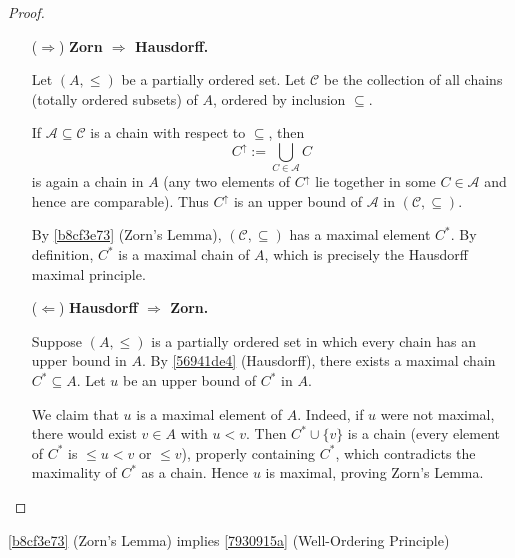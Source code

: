 \begin{proof}
    \begin{enumerate}
        \item[($\Rightarrow$)] \textbf{Zorn $\Rightarrow$ Hausdorff.}
        
        Let $(A,\le)$ be a partially ordered set. Let $\mathscr{C}$ be the collection of all chains (totally ordered subsets) of $A$, ordered by inclusion $\subseteq$. 
        
        If $\mathscr{A}\subseteq \mathscr{C}$ is a chain with respect to $\subseteq$, then
        \[
            C^\uparrow := \bigcup_{C\in \mathscr{A}} C
        \]
        is again a chain in $A$ (any two elements of $C^\uparrow$ lie together in some $C\in\mathscr{A}$ and hence are comparable). Thus $C^\uparrow$ is an upper bound of $\mathscr{A}$ in $(\mathscr{C},\subseteq)$.
        
        By \cref{b8cf3e73} (Zorn's Lemma), $(\mathscr{C},\subseteq)$ has a maximal element $C^*$. By definition, $C^*$ is a maximal chain of $A$, which is precisely the Hausdorff maximal principle.
        
        \item[($\Leftarrow$)] \textbf{Hausdorff $\Rightarrow$ Zorn.}
        
        Suppose $(A,\le)$ is a partially ordered set in which every chain has an upper bound in $A$. By \cref{56941de4} (Hausdorff), there exists a maximal chain $C^*\subseteq A$. Let $u$ be an upper bound of $C^*$ in $A$.
        
        We claim that $u$ is a maximal element of $A$. Indeed, if $u$ were not maximal, there would exist $v\in A$ with $u<v$. Then $C^*\cup\{v\}$ is a chain (every element of $C^*$ is $\le u<v$ or $\le v$), properly containing $C^*$, which contradicts the maximality of $C^*$ as a chain. Hence $u$ is maximal, proving Zorn's Lemma.
    \end{enumerate}
\end{proof}

\begin{thm}
    \cref{b8cf3e73} (Zorn's Lemma) implies \cref{7930915a} (Well-Ordering Principle)
\end{thm}

